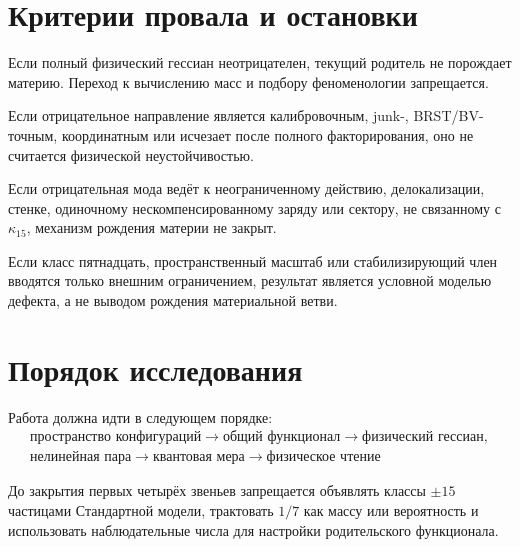\section{Критерии провала и остановки}

\begin{nogocriterion}
Если полный физический гессиан неотрицателен, текущий родитель не порождает
материю. Переход к вычислению масс и подбору феноменологии запрещается.
\end{nogocriterion}

\begin{nogocriterion}
Если отрицательное направление является калибровочным, junk-, BRST/BV-
точным, координатным или исчезает после полного факторирования, оно не
считается физической неустойчивостью.
\end{nogocriterion}

\begin{nogocriterion}
Если отрицательная мода ведёт к неограниченному действию, делокализации,
стенке, одиночному нескомпенсированному заряду или сектору, не связанному
с $\kappa_{15}$, механизм рождения материи не закрыт.
\end{nogocriterion}

\begin{nogocriterion}
Если класс пятнадцать, пространственный масштаб или стабилизирующий член
вводятся только внешним ограничением, результат является условной моделью
дефекта, а не выводом рождения материальной ветви.
\end{nogocriterion}

\section{Порядок исследования}

Работа должна идти в следующем порядке:
\begin{equation}
 \boxed{\begin{gathered}
 \text{пространство конфигураций}
 \to \text{общий функционал}
 \to \text{физический гессиан},\\
 \text{нелинейная пара}
 \to \text{квантовая мера}
 \to \text{физическое чтение}
 \end{gathered}}
\end{equation}

До закрытия первых четырёх звеньев запрещается объявлять классы
$\pm15$ частицами Стандартной модели, трактовать $1/7$ как массу или
вероятность и использовать наблюдательные числа для настройки
родительского функционала.

